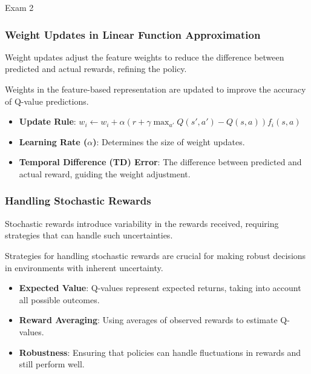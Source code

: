 \begin{examnotes}{Exam 2}
    \subsubsection*{Weight Updates in Linear Function Approximation}
    
    Weight updates adjust the feature weights to reduce the difference between predicted and actual rewards, refining the policy.
    
    \begin{highlight}
        Weights in the feature-based representation are updated to improve the accuracy of Q-value predictions.
        
        \begin{itemize}
            \item \textbf{Update Rule}: $w_i \leftarrow w_i + \alpha \left( r + \gamma \max_{a'} Q(s', a') - Q(s, a) \right) f_i(s, a)$
            \item \textbf{Learning Rate ($\alpha$)}: Determines the size of weight updates.
            \item \textbf{Temporal Difference (TD) Error}: The difference between predicted and actual reward, guiding the weight adjustment.
        \end{itemize}
    \end{highlight}
    
    \subsubsection*{Handling Stochastic Rewards}
    
    Stochastic rewards introduce variability in the rewards received, requiring strategies that can handle such uncertainties.
    
    \begin{highlight}
        Strategies for handling stochastic rewards are crucial for making robust decisions in environments with inherent uncertainty.
        
        \begin{itemize}
            \item \textbf{Expected Value}: Q-values represent expected returns, taking into account all possible outcomes.
            \item \textbf{Reward Averaging}: Using averages of observed rewards to estimate Q-values.
            \item \textbf{Robustness}: Ensuring that policies can handle fluctuations in rewards and still perform well.
        \end{itemize}
    \end{highlight}
    

\end{examnotes}
